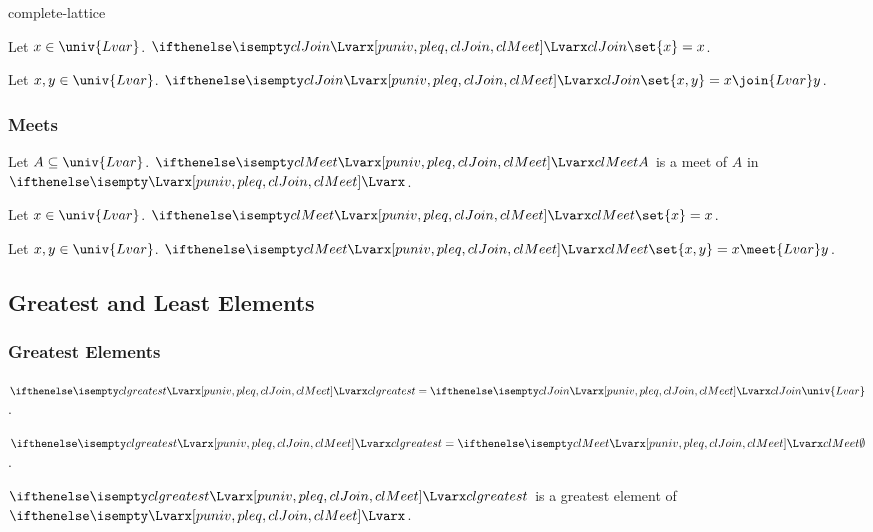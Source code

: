 \documentclass{stex}
\begin{document}
\begin{smodule}{complete-lattice}
\begin{forthel}
    \begin{proposition}
      Let $x \in \univ{Lvar}$.
      $\Join{Lvar} \set{x} = x$.
    \end{proposition}
    
    \begin{proposition}
      Let $x, y \in \univ{Lvar}$.
      $\Join{Lvar} \set{x,y} = x \join{Lvar} y$.
    \end{proposition}
  \end{forthel}

  \subsubsection{Meets}

  \begin{forthel}
    \begin{signature}
      Let $A \subseteq \univ{Lvar}$.
      $\Meet{Lvar} A$ is a meet of $A$ in $\Lvar{}$.
    \end{signature}
    
    \begin{proposition}
      Let $x \in \univ{Lvar}$.
      $\Meet{Lvar} \set{x} = x$.
    \end{proposition}
    
    \begin{proposition}
      Let $x, y \in \univ{Lvar}$.
      $\Meet{Lvar} \set{x,y} = x \meet{Lvar} y$.
    \end{proposition}
  \end{forthel}

  \subsection{Greatest and Least Elements}

  \subsubsection{Greatest Elements}

  \begin{forthel}
    \begin{definition}
      $\greatest{Lvar} = \Join{Lvar} \univ{Lvar}$.
    \end{definition}

    \begin{proposition}
      $\greatest{Lvar} = \Meet{Lvar} \emptyset$.
    \end{proposition}

    \begin{proposition}
      $\greatest{Lvar}$ is a greatest element of $\Lvar{}$.
    \end{proposition}
  \end{forthel}


\end{smodule}
\end{document}
